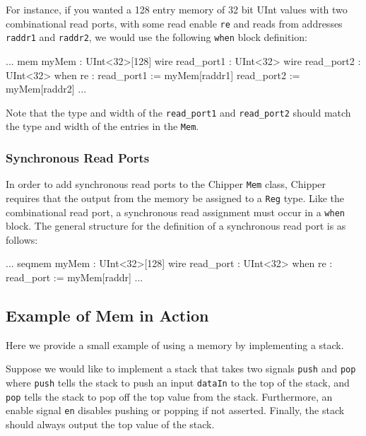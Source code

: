 For instance, if you wanted a 128 entry memory of 32 bit UInt values with two combinational read ports, with some read enable \verb+re+ and reads from addresses \verb+raddr1+ and \verb+raddr2+, we would use the following \verb+when+ block definition:

\begin{stanza}
...
mem myMem : UInt<32>[128]
wire read_port1 : UInt<32>
wire read_port2 : UInt<32>
when re :
  read_port1 := myMem[raddr1]
  read_port2 := myMem[raddr2]
...
\end{stanza}

Note that the type and width of the \verb+read_port1+ and \verb+read_port2+ should match the type and width of the entries in the \verb+Mem+.

\subsubsection{Synchronous Read Ports}

In order to add synchronous read ports to the Chipper \verb+Mem+ class, Chipper requires that the output from the memory be assigned to a \verb+Reg+ type. Like the combinational read port, a synchronous read assignment must occur in a \verb+when+ block. The general structure for the definition of a synchronous read port is as follows:

\begin{stanza}
...
seqmem myMem : UInt<32>[128]
wire read_port : UInt<32>
when re :
  read_port := myMem[raddr]
...
\end{stanza}

\subsection{Example of Mem in Action}


Here we provide a small example of using a memory by implementing a stack.

Suppose we would like to implement a stack that takes two signals \verb+push+ and \verb+pop+ where \verb+push+ tells the stack to push an input \verb+dataIn+ to the top of the stack, and \verb+pop+ tells the stack to pop off the top value from the stack. Furthermore, an enable signal \verb+en+ disables pushing or popping if not asserted. Finally, the stack should always output the top value of the stack.

